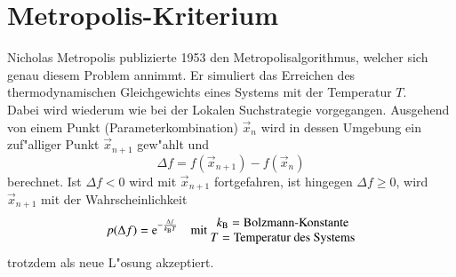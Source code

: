 \section{Metropolis-Kriterium}
	Nicholas Metropolis publizierte 1953 den Metropolisalgorithmus, welcher sich genau diesem Problem annimmt. Er simuliert das Erreichen des thermodynamischen Gleichgewichts eines Systems mit der Temperatur $T$.\\
Dabei wird wiederum wie bei der Lokalen Suchstrategie vorgegangen. Ausgehend von einem Punkt (Parameterkombination) $\vec{x}_{n}$ wird in dessen Umgebung ein zuf"alliger Punkt $\vec{x}_{n+1}$ gew"ahlt und $$\Delta f = f(\vec{x}_{n+1}) - f(\vec{x}_{n})$$ berechnet.
Ist $\Delta f < 0$ wird mit $\vec{x}_{n+1}$ fortgefahren, ist hingegen $\Delta f \geq 0$, wird $\vec{x}_{n+1}$ mit der Wahrscheinlichkeit $$ p(\Delta f) = {\rm e}^{-\frac{\Delta f}{k_{\rm B} T}}\quad \text{mit } \begin{matrix}k_{\rm B} = \text{Bolzmann-Konstante}\\
T = \text{Temperatur des Systems}
\end{matrix}$$ trotzdem als neue L"osung akzeptiert.\\
